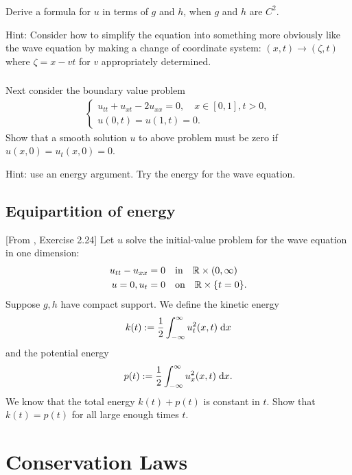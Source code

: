 \documentclass[11pt,letterpaper]{report}
\begin{document}
\subsection{}
Derive a formula for $u$ in terms of $g$ and $h$, when $g$ and $h$ are $C^2$. 

Hint: Consider how to simplify the equation into something more obviously like the wave equation
by making a change of coordinate system: $(x,t)\to (\zeta,t)$ where $\zeta = x-vt$ for $v$ appropriately determined. 

\subsection{}
Next consider the boundary value problem 
\begin{align}
    \begin{cases}
        u_{tt}+u_{xt}-2u_{xx} = 0,\quad x\in[0,1], t>0,\\
        u(0,t) = u(1,t) = 0.
    \end{cases}
\end{align}
Show that a smooth solution $u$ to above problem must be zero if $u(x,0)=u_t(x,0)=0$. 

Hint: use an energy argument. Try the energy for the wave equation. 

\section{Equipartition of energy}
[From \cite{Evans_10}, Exercise 2.24] Let $u$ solve the initial-value problem for the wave equation in one dimension:
\begin{align}
    u_{tt}-u_{xx} = 0 &\quad \mbox{in} \quad \mathbb{R}\times(0,\infty)\\
    u=0, u_t=0 &\quad \mbox{on} \quad \mathbb{R}\times\{t=0\}.
\end{align}
Suppose $g,h$ have compact support. We define the kinetic energy
\begin{align}
    k(t):= \frac{1}{2}\int_{-\infty}^\infty u_t^2(x,t)\;\mathrm{d} x
\end{align}
and the potential energy
\begin{align}
    p(t):= \frac{1}{2}\int_{-\infty}^\infty u_x^2(x,t)\;\mathrm{d} x.
\end{align}
We know that the total energy $k(t)+p(t)$ is constant in $t$. Show that $k(t)=p(t)$ for all large enough times $t$. 

\chapter{Conservation Laws}
\end{document}
